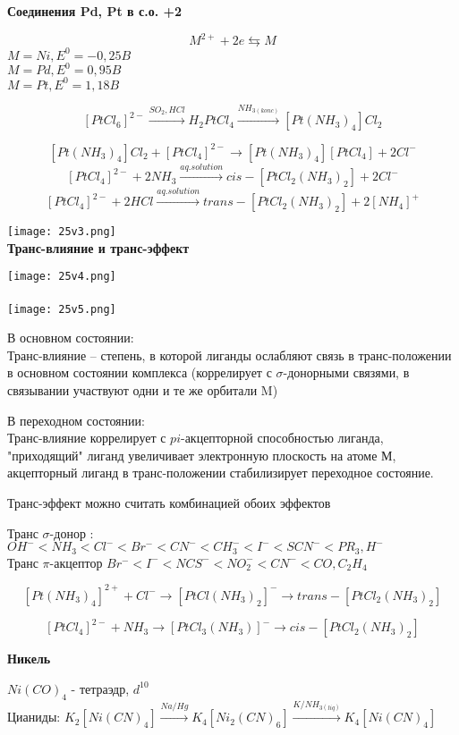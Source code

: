\textbf{Соединения Pd, Pt в с.о. +2}

$$M^{2+} + 2e \leftrightarrows M$$
$M = Ni, E^0 = -0,25 B$\\
$M = Pd, E^0 = 0,95 B$\\
$M = Pt, E^0 = 1,18 B$

$$[PtCl_6]^{2-} \xrightarrow{SO_2, HCl} H_2PtCl_4 \xrightarrow{NH_{3(konc)}} [Pt(NH_3)_4]Cl_2$$

$$[Pt(NH_3)_4]Cl_2 + [PtCl_4]^{2-} \rightarrow [Pt(NH_3)_4][PtCl_4] + 2Cl^-$$
$$[PtCl_4]^{2-} + 2NH_3\xrightarrow{aq.solution} cis-[PtCl_2(NH_3)_2] + 2Cl^-$$
$$[PtCl_4]^{2-} + 2HCl \xrightarrow{aq. solution} trans-[PtCl_2(NH_3)_2] + 2[NH_4]^+$$

\texttt{[image: 25v3.png]}
\\

\textbf{Транс-влияние и транс-эффект}

\texttt{[image: 25v4.png]}\\
\\

\texttt{[image: 25v5.png]}

В основном состоянии:\\
Транс-влияние -- степень, в которой лиганды ослабляют связь в транс-положении в основном состоянии комплекса (коррелирует с $\sigma$-донорными связями, в связывании участвуют одни и те же орбитали M)

В переходном состоянии:\\
Транс-влияние коррелирует с $pi$-акцепторной способностью лиганда, "приходящий" лиганд увеличивает электронную плоскость на атоме М, акцепторный лиганд в транс-положении стабилизирует переходное состояние.

Транс-эффект можно считать комбинацией обоих эффектов

Транс $\sigma$-донор : $OH^- < NH_3 < Cl^- < Br^- < CN^- < CH_3^- <I^- < SCN^- < PR_3 , H^-$\\
Транс $\pi$-акцептор $Br^- < I^- < NCS^- < NO_2^- < CN^- < CO , C_2H_4$

$$[Pt(NH_3)_4]^{2+} + Cl^- \rightarrow [PtCl(NH_3)_2]^- \rightarrow trans-[PtCl_2(NH_3)_2]$$

$$[PtCl_4]^{2-} + NH_3 \rightarrow [PtCl_3(NH_3)]^- \rightarrow cis-[PtCl_2(NH_3)_2]$$

\textbf{Никель}

$Ni(CO)_4$ - тетраэдр, $d^{10}$\\
Цианиды: $K_2[Ni(CN)_4] \xrightarrow{Na/Hg} K_4[Ni_2(CN)_6] \xrightarrow{K/NH_{3(liq)}} K_4[Ni(CN)_4]$

